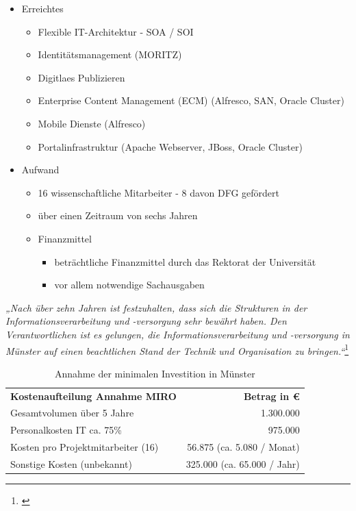 \begin{itemize}
	\item Erreichtes
	\begin{itemize}
		\item Flexible IT-Architektur - SOA / SOI
		\item Identitätsmanagement (MORITZ)
		\item Digitlaes Publizieren
		\item Enterprise Content Management (ECM) (Alfresco, SAN, Oracle Cluster)
		\item Mobile Dienste (Alfresco)
		\item Portalinfrastruktur (Apache Webserver, JBoss, Oracle Cluster)
	\end{itemize}
	\item Aufwand
	\begin{itemize}
		\item 16 wissenschaftliche Mitarbeiter - 8 davon DFG gefördert
		\item über einen Zeitraum von sechs Jahren
		\item Finanzmittel
		\begin{itemize}
			\item beträchtliche Finanzmittel durch das Rektorat der Universität
			\item vor allem notwendige Sachausgaben
		\end{itemize}
	\end{itemize}
\end{itemize}

\textit{„Nach über zehn Jahren ist festzuhalten, dass sich die Strukturen in der Informationsverarbeitung und -versorgung sehr bewährt haben. Den Verantwortlichen ist es gelungen, die Informationsverarbeitung und -versorgung in Münster auf einen beachtlichen Stand der Technik und Organisation zu bringen.“}\footnote{\cite{bode_informationsmanagement_2010}}

\begin{table}[h!]
	\begin{tabularx}{\textwidth}{l|r}
		\hline
		\textbf{Kostenaufteilung Annahme MIRO} & \textbf{Betrag in \euro}\\
		Gesamtvolumen über 5 Jahre & 1.300.000\\
		Personalkosten IT ca. 75\% & 975.000\\
		Kosten pro Projektmitarbeiter (16) & 56.875 (ca. 5.080 / Monat)\\ 
		Sonstige Kosten (unbekannt) & 325.000 (ca. 65.000 / Jahr)\\
		\hline
    \end{tabularx}
    \caption{Annahme der minimalen Investition in Münster}
    \label{tab_minimale_investition_munster}
\end{table}

